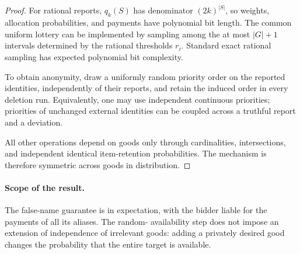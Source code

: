 \documentclass[format=acmsmall, review=false]{acmart}
\begin{document}
\begin{proof}
For rational reports, \(q_k(S)\) has denominator
\((2k)^{|S|}\), so weights, allocation probabilities, and
payments have polynomial bit length. The common uniform
lottery can be implemented by sampling among the at most
\(|G|+1\) intervals determined by the rational thresholds
\(r_i\). Standard exact rational sampling has expected
polynomial bit complexity.

To obtain anonymity, draw a uniformly random priority order
on the reported identities, independently of their reports,
and retain the induced order in every deletion run.
Equivalently, one may use independent continuous priorities;
priorities of unchanged external identities can be coupled
across a truthful report and a deviation.

All other operations depend on goods only through
cardinalities, intersections, and independent identical
item-retention probabilities. The mechanism is therefore
symmetric across goods in distribution.
\end{proof}

\paragraph{Scope of the result.}
The false-name guarantee is in expectation, with the bidder
liable for the payments of all its aliases. The random-
availability step does not impose an extension of independence
of irrelevant goods: adding a privately desired good changes
the probability that the entire target is available.



\end{document}
